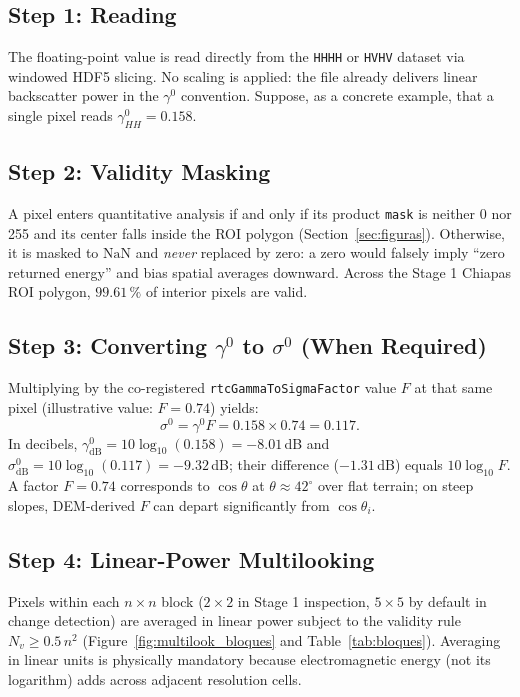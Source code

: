 \documentclass[11pt,a4paper]{article}
\begin{document}
\subsection{Step 1: Reading}

The floating-point value is read directly from the \texttt{HHHH} or \texttt{HVHV} dataset via windowed HDF5 slicing. No scaling is applied: the file already delivers linear backscatter power in the $\gamma^0$ convention. Suppose, as a concrete example, that a single pixel reads $\gamma^0_{HH}=0.158$.

\subsection{Step 2: Validity Masking}

A pixel enters quantitative analysis if and only if its product \texttt{mask} is neither 0 nor 255 and its center falls inside the ROI polygon (Section~\ref{sec:figuras}). Otherwise, it is masked to $\mathrm{NaN}$ and \emph{never} replaced by zero: a zero would falsely imply ``zero returned energy'' and bias spatial averages downward. Across the Stage 1 Chiapas ROI polygon, $99.61\,\mathrm{\%}$ of interior pixels are valid.

\subsection{Step 3: Converting $\gamma^0$ to $\sigma^0$ (When Required)}

Multiplying by the co-registered \texttt{rtcGammaToSigmaFactor} value $F$ at that same pixel (illustrative value: $F=0.74$) yields:
\begin{equation}
  \sigma^0 = \gamma^0F = 0.158\times0.74 = 0.117 .
\end{equation}
In decibels, $\gamma^0_{\mathrm{dB}}=10\log_{10}(0.158)=-8.01$\,dB and $\sigma^0_{\mathrm{dB}}=10\log_{10}(0.117)=-9.32$\,dB; their difference ($-1.31$\,dB) equals $10\log_{10}F$. A factor $F=0.74$ corresponds to $\cos\theta$ at $\theta\approx42^\circ$ over flat terrain; on steep slopes, DEM-derived $F$ can depart significantly from $\cos\theta_i$.

\subsection{Step 4: Linear-Power Multilooking}

Pixels within each $n\times n$ block ($2\times2$ in Stage 1 inspection, $5\times5$ by default in change detection) are averaged in linear power subject to the validity rule $N_v\ge0.5\,n^2$ (Figure~\ref{fig:multilook_bloques} and Table~\ref{tab:bloques}). Averaging in linear units is physically mandatory because electromagnetic energy (not its logarithm) adds across adjacent resolution cells.
\end{document}
